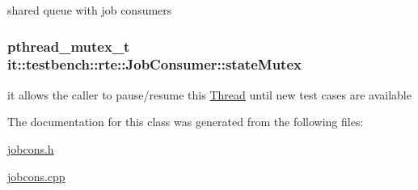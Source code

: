 shared queue with job consumers \hypertarget{classit_1_1testbench_1_1rte_1_1JobConsumer_a3bd07571a6b91de9dd7b6a19b7a6df53}{
\subsubsection[{state\-Mutex}]{\setlength{\rightskip}{0pt plus 5cm}pthread\-\_\-mutex\-\_\-t it\-::testbench\-::rte\-::\-Job\-Consumer\-::state\-Mutex\hspace{0.3cm}{\ttfamily [private]}}}\label{dc/d6e/classit_1_1testbench_1_1rte_1_1JobConsumer_a3bd07571a6b91de9dd7b6a19b7a6df53}
it allows the caller to pause/resume this \hyperlink{classit_1_1testbench_1_1rte_1_1Thread}{Thread} until new test cases are available 

The documentation for this class was generated from the following files\-:\begin{DoxyCompactItemize}
\item 
\hyperlink{jobcons_8h}{jobcons.\-h}\item 
\hyperlink{jobcons_8cpp}{jobcons.\-cpp}\end{DoxyCompactItemize}
